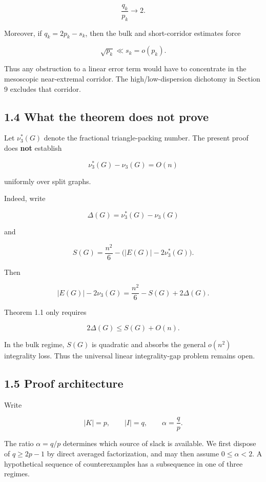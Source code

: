 \documentclass[
  11pt,
]{article}
\begin{document}
\[
\frac{q_k}{p_k}\longrightarrow 2.
\]

Moreover, if \(q_k=2p_k-s_k\), then the bulk and short-corridor
estimates force

\[
\sqrt{p_k}\ll s_k=o(p_k).
\]

Thus any obstruction to a linear error term would have to concentrate in
the mesoscopic near-extremal corridor. The high/low-dispersion dichotomy
in Section 9 excludes that corridor.

\subsection{1.4 What the theorem does not
prove}\label{what-the-theorem-does-not-prove}

Let \(\nu_3^*(G)\) denote the fractional triangle-packing number. The
present proof does \textbf{not} establish

\[
\nu_3^*(G)-\nu_3(G)=O(n)
\tag{1.4}
\]

uniformly over split graphs.

Indeed, write

\[
\Delta(G)=\nu_3^*(G)-\nu_3(G)
\]

and

\[
S(G)=\frac{n^2}{6}-\bigl(|E(G)|-2\nu_3^*(G)\bigr).
\]

Then

\[
|E(G)|-2\nu_3(G)
=
\frac{n^2}{6}-S(G)+2\Delta(G).
\tag{1.5}
\]

Theorem 1.1 only requires

\[
2\Delta(G)\le S(G)+O(n).
\]

In the bulk regime, \(S(G)\) is quadratic and absorbs the general
\(o(n^2)\) integrality loss. Thus the universal linear integrality-gap
problem remains open.

\subsection{1.5 Proof architecture}\label{proof-architecture}

Write

\[
|K|=p,
\qquad
|I|=q,
\qquad
\alpha=\frac qp.
\]

The ratio \(\alpha=q/p\) determines which source of slack is available.
We first dispose of \(q\ge2p-1\) by direct averaged factorization, and
may then assume \(0\le\alpha<2\). A hypothetical sequence of
counterexamples has a subsequence in one of three regimes.
\end{document}
